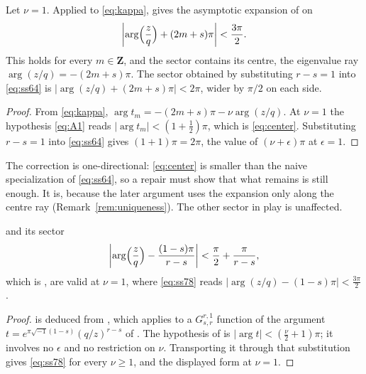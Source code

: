 \begin{lemma}
  \label{lem:center}
  Let \(\nu=1\).  Applied to \eqref{eq:kappa}, \cite[Theorem~A.1]{SS} gives
  the asymptotic expansion of \cite[Proposition~7.5]{SS} on
  \begin{equation}
    \label{eq:center}
    \left|\arg\Bigl(\frac zq\Bigr)+(2m+s)\pi\right|<\frac{3\pi}{2}.
  \end{equation}
  This holds for every \(m\in\mathbf Z\), and the sector contains its
  centre, the eigenvalue ray \(\arg(z/q)=-(2m+s)\pi\).  The sector obtained
  by substituting \(r-s=1\) into \eqref{eq:ss64} is
  \(\bigl|\arg(z/q)+(2m+s)\pi\bigr|<2\pi\), wider by \(\pi/2\) on each side.
\end{lemma}

\begin{proof}
  From \eqref{eq:kappa},
  \(\arg t_{m}=-(2m+s)\pi-\nu\arg(z/q)\).  At \(\nu=1\) the hypothesis
  \eqref{eq:A1} reads \(|\arg t_{m}|<(1+\tfrac12)\pi\), which is
  \eqref{eq:center}.  Substituting \(r-s=1\) into \eqref{eq:ss64} gives
  \((1+1)\pi=2\pi\), the value of \((\nu+\epsilon)\pi\) at \(\epsilon=1\).
\end{proof}

The correction is one-directional: \eqref{eq:center} is smaller than the
naive specialization of \eqref{eq:ss64}, so a repair must show that what
remains is still enough.  It is, because the later argument uses the
expansion only along the centre ray (Remark~\ref{rem:uniqueness}).  The
other sector in play is unaffected.

\begin{lemma}
  \label{lem:ambient}
  \cite[Proposition~8.2]{SS} and its sector
  \begin{equation}
    \label{eq:ss78}
    \left|\arg\Bigl(\frac zq\Bigr)-\frac{(1-s)\pi}{r-s}\right|
    <\frac\pi2+\frac{\pi}{r-s},
  \end{equation}
  which is \cite[(78)]{SS}, are valid at \(\nu=1\), where \eqref{eq:ss78}
  reads \(\bigl|\arg(z/q)-(1-s)\pi\bigr|<\tfrac{3\pi}{2}\).
\end{lemma}

\begin{proof}
  \cite[Proposition~8.2]{SS} is deduced from \cite[(76)]{SS}, which applies
  \cite[Theorem~A.2]{SS} to a \(G^{r,1}_{s,r}\) function of the argument
  \(t=e^{\pi\sqrt{-1}(1-s)}(q/z)^{r-s}\) of \cite[(75)]{SS}.  The hypothesis
  of \cite[Theorem~A.2]{SS} is
  \(|\arg t|<(\tfrac\nu2+1)\pi\); it involves no \(\epsilon\) and no
  restriction on \(\nu\).  Transporting it through that substitution gives
  \eqref{eq:ss78} for every \(\nu\ge1\), and the displayed form
  at \(\nu=1\).
\end{proof}

